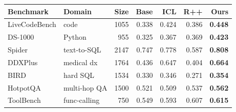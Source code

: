 \begin{tabular}{llrrrrr}
\toprule
Benchmark & Domain & Size & Base & ICL & R++ & \textbf{Ours} \\
\midrule
LiveCodeBench & code & 1055 & 0.338 & 0.424 & 0.386 & \textbf{0.448} \\
DS-1000 & Python & 955 & 0.325 & 0.367 & 0.369 & \textbf{0.423} \\
Spider & text-to-SQL & 2147 & 0.747 & 0.778 & 0.587 & \textbf{0.808} \\
DDXPlus & medical dx & 1764 & 0.436 & 0.647 & 0.404 & \textbf{0.664} \\
BIRD & hard SQL & 1534 & 0.330 & 0.346 & 0.271 & \textbf{0.354} \\
HotpotQA & multi-hop QA & 1500 & 0.521 & 0.509 & 0.537 & \textbf{0.562} \\
ToolBench & func-calling & 750 & 0.549 & 0.593 & 0.607 & \textbf{0.615} \\
\bottomrule
\end{tabular}
